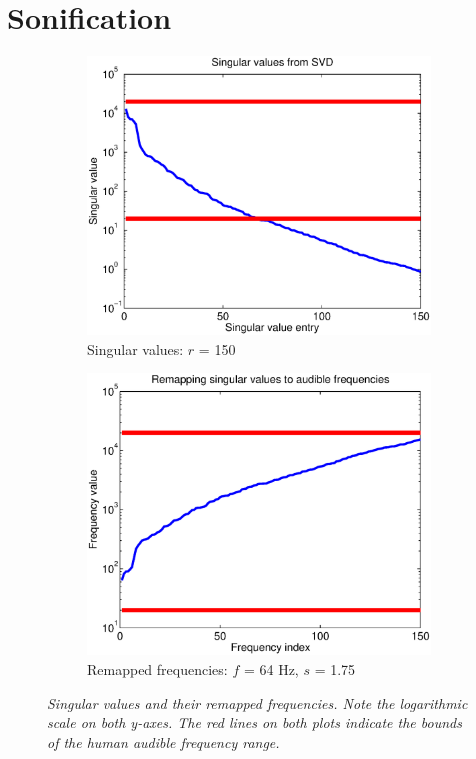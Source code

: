 \documentclass[11pt]{article}
\begin{document}
\section*{Sonification}

\begin{figure}
	\begin{subfigure}[h]{0.5\textwidth}
		\includegraphics[width=\textwidth]{figures/singulars.eps}
		\caption{Singular values: $r$ = 150} 
		\label{fig:singulars}
	\end{subfigure}
	\begin{subfigure}[h]{0.5\textwidth}
		\includegraphics[width=\textwidth]{figures/remap_freqs.eps}
		\caption{Remapped frequencies: $f$ = 64 Hz, $s$ = 1.75}
		\label{fig:freqs}
	\end{subfigure}
	\caption{\em Singular values and their remapped frequencies. Note the logarithmic scale on both y-axes. The red lines on both plots indicate the bounds of the human audible frequency range.}
\end{figure}
\end{document}
